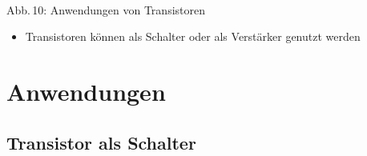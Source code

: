 \begin{frame}
\begin{minipage}{0.4\textwidth}
\begin{center}
		\end{center}	
	\end{minipage}\\
	\vspace{3mm}
	{\tiny Abb.\,10: Anwendungen von Transistoren~\cite{bnetza}}
	\begin{itemize}
		\item	Transistoren können als Schalter oder als Verstärker genutzt werden
	\end{itemize}
\end{frame}

\section*{Anwendungen}
\subsection*{Transistor als Schalter}

